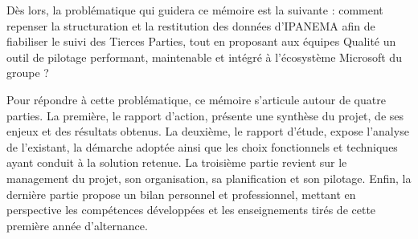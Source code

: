 \indent Dès lors, la problématique qui guidera ce mémoire est la suivante : comment repenser 
la structuration et la restitution des données d'IPANEMA afin de fiabiliser le suivi des Tierces 
Parties, tout en proposant aux équipes Qualité un outil de pilotage performant, maintenable et 
intégré à l'écosystème Microsoft du groupe ?

\indent Pour répondre à cette problématique, ce mémoire s'articule autour de quatre parties. 
La première, le rapport d'action, présente une synthèse du projet, de ses enjeux et des 
résultats obtenus. La deuxième, le rapport d'étude, expose l'analyse de l'existant, la démarche 
adoptée ainsi que les choix fonctionnels et techniques ayant conduit à la solution retenue. La 
troisième partie revient sur le management du projet, son organisation, sa planification et son 
pilotage. Enfin, la dernière partie propose un bilan personnel et professionnel, mettant en 
perspective les compétences développées et les enseignements tirés de cette première année 
d'alternance.
